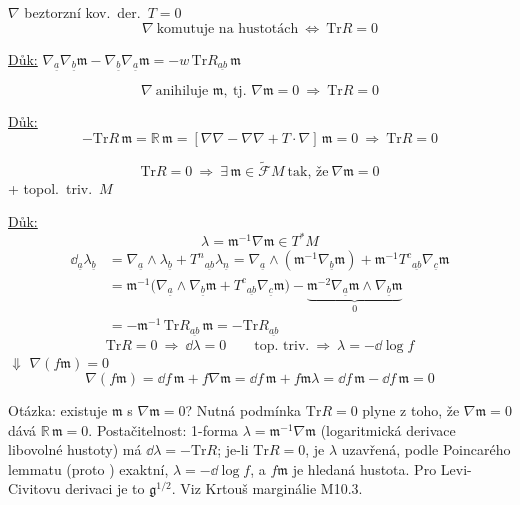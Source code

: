 \begin{veta}[Věta]
$\nabla$ beztorzní kov.\ der.\ \quad $T = 0$
\[
  \nabla\ \text{komutuje na hustotách} \ \Longleftrightarrow\ \mathrm{Tr}R = 0
\]
\end{veta}
\underline{Důk:} \quad
$\nabla_{\underline a}\nabla_{\underline b}\mathfrak{m} - \nabla_{\underline b}\nabla_{\underline a}\mathfrak{m} = -w\,\mathrm{Tr}R_{\underline{ab}}\,\mathfrak{m}$

\begin{veta}[Věta]
\[
  \nabla\ \text{anihiluje } \mathfrak{m},\ \text{tj. } \nabla\mathfrak{m} = 0 \ \Longrightarrow\ \mathrm{Tr}R = 0
\]
\end{veta}
\underline{Důk:}
\[
  -\mathrm{Tr}R\,\mathfrak{m} = \mathbb{R}\,\mathfrak{m} = [\nabla\nabla - \nabla\nabla + T\cdot\nabla]\,\mathfrak{m} = 0 \ \Rightarrow\ \mathrm{Tr}R = 0
\]

\begin{veta}[Věta]
\[
  \mathrm{Tr}R = 0 \ \Longrightarrow\ \exists\,\mathfrak{m}\in\tilde{\mathcal{F}}M \ \text{tak, že}\ \nabla\mathfrak{m} = 0
\]
+ topol.\ triv.\ $M$
\end{veta}
\underline{Důk:}
\[
  \lambda = \mathfrak{m}^{-1}\nabla\mathfrak{m}\in T^*M
\]
\begin{align*}
  \dd_{\underline a}\lambda_{\underline b} &= \nabla_{\underline a}\wedge\lambda_{\underline b} + T^n{}_{\underline{ab}}\lambda_{\underline n}
  = \nabla_{\underline a}\wedge(\mathfrak{m}^{-1}\nabla_{\underline b}\mathfrak{m}) + \mathfrak{m}^{-1}T^c{}_{\underline{ab}}\nabla_{\underline c}\mathfrak{m} \\
  &= \mathfrak{m}^{-1}\big(\nabla_{\underline a}\wedge\nabla_{\underline b}\mathfrak{m} + T^c{}_{\underline{ab}}\nabla_{\underline c}\mathfrak{m}\big)
   - \underbrace{\mathfrak{m}^{-2}\nabla_{\underline a}\mathfrak{m}\wedge\nabla_{\underline b}\mathfrak{m}}_{0} \\
  &= -\mathfrak{m}^{-1}\,\mathrm{Tr}R_{\underline{ab}}\,\mathfrak{m} = -\mathrm{Tr}R_{\underline{ab}}
\end{align*}
\[
  \mathrm{Tr}R = 0 \ \Rightarrow\ \dd\lambda = 0 \qquad \text{top.\ triv.} \ \Rightarrow\ \lambda = -\dd\log f
\]
$\Downarrow$ \quad $\nabla(f\mathfrak{m}) = 0$
\[
  \nabla(f\mathfrak{m}) = \dd f\,\mathfrak{m} + f\nabla\mathfrak{m} = \dd f\,\mathfrak{m} + f\mathfrak{m}\lambda = \dd f\,\mathfrak{m} - \dd f\,\mathfrak{m} = 0
\]

\begin{vysvetleni}
Otázka: existuje  $\mathfrak m$ s $\nabla\mathfrak m = 0$? Nutná podmínka $\mathrm{Tr}R = 0$ plyne z toho, že
$\nabla\mathfrak m = 0$ dává $\mathbb R\,\mathfrak m = 0$. Postačitelnost: 1-forma $\lambda = \mathfrak m^{-1}\nabla\mathfrak m$ (logaritmická derivace
libovolné hustoty) má $\dd\lambda = -\mathrm{Tr}R$; je-li $\mathrm{Tr}R=0$, je $\lambda$ uzavřená, podle Poincarého lemmatu (proto
) exaktní, $\lambda = -\dd\log f$, a $f\mathfrak m$ je hledaná hustota. Pro Levi-Civitovu derivaci je to $\mathfrak g^{1/2}$.
Viz Krtouš marginálie M10.3.
\end{vysvetleni}

